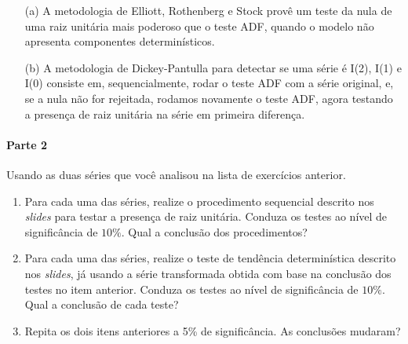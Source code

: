 \documentclass[10pt,a4paper]{article}
\begin{document}
\begin{enumerate}
	\begin{itemize}
		\item[(a)] A metodologia de Elliott, Rothenberg e Stock provê um teste da nula de uma raiz unitária mais poderoso que o teste ADF, quando o modelo não apresenta componentes determinísticos.
		\item[(b)] A metodologia de Dickey-Pantulla para detectar se uma série é I(2), I(1) e I(0) consiste em, sequencialmente, rodar o teste ADF com a série original, e, se a nula não for rejeitada, rodamos novamente o teste ADF, agora testando a presença de raiz unitária na série em primeira diferença.
	\end{itemize}
\end{enumerate}
\paragraph{Parte 2}
Usando as duas séries que você analisou na lista de exercícios anterior.
\begin{enumerate}
	\item Para cada uma das séries, realize o procedimento sequencial descrito nos \textit{slides} para testar a presença de raiz unitária. Conduza os testes ao nível de significância de $10\%$. Qual a conclusão dos procedimentos?
	\item Para cada uma das séries, realize o teste de tendência determinística descrito nos \textit{slides}, já usando a série transformada obtida com base na conclusão dos testes no item anterior. Conduza os testes ao nível de significância de $10\%$.  Qual a conclusão de cada teste?
	
	\item Repita os dois itens anteriores a 5\% de significância. As conclusões mudaram?
\end{enumerate}
			
\end{document}
